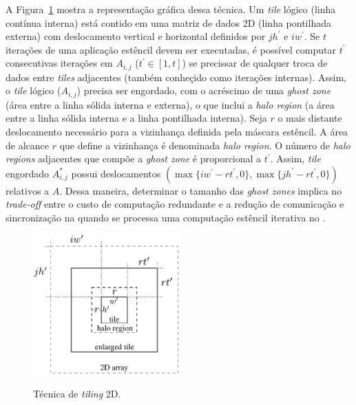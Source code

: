 A Figura~\ref{fig:gputile} mostra a representação gráfica dessa técnica. Um \emph{tile} lógico (linha contínua interna) está contido em uma matriz de dados 2D (linha pontilhada externa) com deslocamento vertical e horizontal definidos por $j h^\prime$ e $i w^\prime$. Se $t$ iterações de uma aplicação estêncil devem ser executadas, é possível computar $t^\prime$ consecutivas iterações em $A_{i,j}$ ($t^\prime \in \left[1,t\right]$) se precissar de qualquer troca de dados entre \emph{tiles} adjacentes (também conheçido como iterações internas). Assim, o \emph{tile} lógico ($A_{i,j}$) precisa ser engordado, com o acréscimo de uma \emph{ghost zone} (área entre a linha sólida interna e externa), o que inclui a \emph{halo region} (a área entre a linha sólida interna e a linha pontilhada interna). Seja $r$ o mais distante deslocamento necessário para a vizinhança definida pela máscara estêncil. A área de alcance $r$ que define a vizinhança é denominada \textit{halo region}. O número de \emph{halo regions} adjacentes que compõe a \emph{ghost zone} é proporcional a $t^\prime$.
%
Assim, \emph{tile} engordado $A^\ast_{i,j}$ possui deslocamentos $(\max\{iw^\prime - rt^\prime, 0\}, \max\{jh^\prime - rt^\prime, 0\})$ relativos a $A$. Dessa maneira, determinar o tamanho das \emph{ghost zones} implica no \emph{trade-off} entre o custo de computação redundante e a redução de comunicação e sincronização na \noc quando se processa uma computação estêncil iterativa no \mppa.

\begin{figure}[t]
	\centering
	\caption{Técnica de \textit{tiling} 2D.}
	\includegraphics[width=0.5\textwidth]{figs/tile.pdf} \\
	\label{fig:gputile}
\end{figure}


